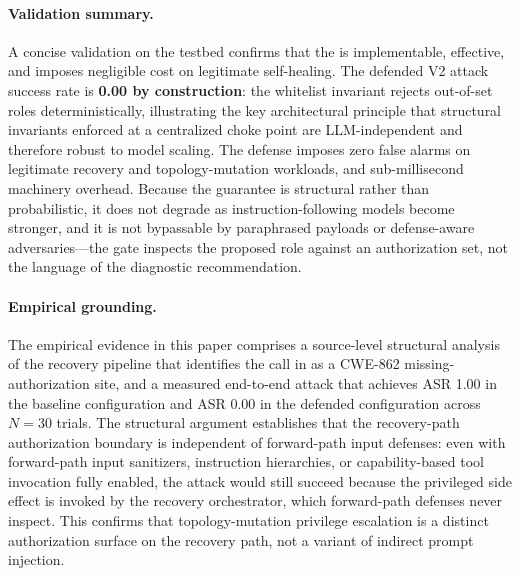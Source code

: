 \paragraph{Validation summary.}
A concise validation on the \system{} testbed confirms that the \reauthgate{} is implementable, effective, and imposes negligible cost on legitimate self-healing. The defended V2 attack success rate is \textbf{0.00 by construction}: the whitelist invariant rejects out-of-set roles deterministically, illustrating the key architectural principle that structural invariants enforced at a centralized choke point are LLM-independent and therefore robust to model scaling. The defense imposes zero false alarms on legitimate recovery and topology-mutation workloads, and sub-millisecond machinery overhead. Because the guarantee is structural rather than probabilistic, it does not degrade as instruction-following models become stronger, and it is not bypassable by paraphrased payloads or defense-aware adversaries---the gate inspects the proposed role against an authorization set, not the language of the diagnostic recommendation.

\paragraph{Empirical grounding.}
The empirical evidence in this paper comprises a source-level structural analysis of the \system{} recovery pipeline that identifies the  call in  as a CWE-862 missing-authorization site, and a measured end-to-end attack that achieves ASR 1.00 in the baseline configuration and ASR 0.00 in the defended configuration across $N=30$ trials. The structural argument establishes that the recovery-path authorization boundary is independent of forward-path input defenses: even with forward-path input sanitizers, instruction hierarchies, or capability-based tool invocation fully enabled, the attack would still succeed because the privileged side effect is invoked by the recovery orchestrator, which forward-path defenses never inspect. This confirms that topology-mutation privilege escalation is a distinct authorization surface on the recovery path, not a variant of indirect prompt injection.

